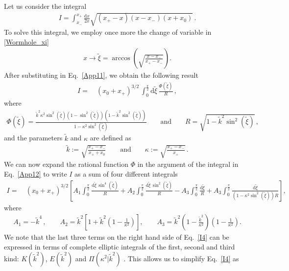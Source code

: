 \documentclass[aps,nofootinbib,prd,superscriptaddress,eqsecnum,showpacs,showkeys,preprintnumbers,altaffilletter]{revtex4}
\def\D{\mathrm{d}}
\newcommand{\kn}{\kappa}
\newcommand{\txi}{\tilde{\xi}}
\begin{document}
Let us consider the integral
\begin{align}
	\label{App11}
	I = \int_{x_-}^{x_+} \frac{\D x}{2x} \sqrt{(x_+ - x) (x-x_-) (x+x_0) } 
	\,.
\end{align}
To solve this integral, we employ once more the change of variable  in \eqref{Wormhole_xi}
\begin{align}
	x\rightarrow\txi = \arccos\left(\sqrt{\frac{x-x_-}{x_+-x_-}}\right).
\end{align}
After substituting in Eq.~\eqref{App11}, we obtain the following result 
\begin{align}
	\label{App12}
	I =&~ \left(x_0+x_+\right)^{3/2} \,
	\int^{\frac{\pi}{2}}_{0} {\D \txi}\,
	\frac{\Phi(\txi)}{R}
	\,,
\end{align}
where
\begin{align}
	\Phi(\txi)
	=
	\frac{
		\tilde{k}^2\kappa^2\sin^2(\txi)
		\left(1 - \sin^2(\txi)\right) 
		\left(1- \tilde{k}^2\sin^2(\txi)\right)
	}{1 - \kappa^2\sin^2(\txi)}
	\qquad
	\mathrm{and}
	\qquad
	R
	=
	\sqrt{1- \tilde{k}^ 2\sin^2(\txi)}
	\,,
\end{align}
and the parameters $\tilde{k}$ and $\kappa$ are defined as
\begin{align}
	\tilde{k}:=\sqrt{\frac{x_+ - x_-}{x_+ + x_0}}
	\qquad
	\textrm{and}
	\qquad
	\kn := \sqrt{\frac{x_+ - x_-}{x_+}}
	\,.
\end{align}
We can now expand the rational function $\Phi$ in the argument of the integral in Eq.~\eqref{App12} to write $I$ as a sum of four different integrals
\begin{align}\label{I4}
	I 
	=&~
	\left(x_0+x_+\right)^{3/2} \left[
		A_1 \int^{\frac{\pi}{2}}_{0} \frac{{\D \txi \, \sin^4(\txi)}}{R}
		+ A_2 \int^{\frac{\pi}{2}}_{0} \frac{{\D \txi \, \sin^2(\txi)}}{R}
		- A_3 \int^{\frac{\pi}{2}}_{0} \frac{\D \txi}{R}
		+ A_3 \int^{\frac{\pi}{2}}_{0} \frac{\D \txi}{\left(1-\kappa^2\sin^2(\txi)\right)R}
	\right],
\end{align}
where
\begin{align}
	A_1 = - \tilde{k}^4
	\,,
	\qquad
	A_2 = \tilde{k}^2\left[ 1  + \tilde{k}^2 \left(1 - \frac{1}{\kappa^2}\right)\right],
	\qquad
	A_3 = \tilde{k}^2\left( 1- \frac{\tilde{k}^2}{\kappa^2}\right)\left( 1- \frac{1}{\kappa^2}\right).
\end{align}
We note that the last three terms on the right hand side of Eq.~\eqref{I4} can be expressed in terms of  complete elliptic integrals of the first, second and third kind: $K(\tilde{k}^2)$, $E(\tilde{k}^2)$ and $\Pi(\kappa^2|\tilde{k}^2)$  \cite{abra,Baker1890}. This allows us to simplify Eq.~\eqref{I4} as
\end{document}
